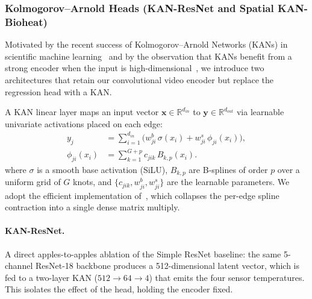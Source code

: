 \subsubsection{Kolmogorov--Arnold Heads (KAN-ResNet and Spatial KAN-Bioheat)}\label{sec:kan_models}
Motivated by the recent success of Kolmogorov--Arnold Networks (KANs) in scientific machine learning~\cite{liu2024kan,wang2024kinn,patra2024pikan} and by the observation that KANs benefit from a strong encoder when the input is high-dimensional~\cite{shen2025alpkan}, we introduce two architectures that retain our convolutional video encoder but replace the regression head with a KAN.

A KAN linear layer maps an input vector $\mathbf{x}\in\mathbb{R}^{d_{in}}$ to $\mathbf{y}\in\mathbb{R}^{d_{out}}$ via learnable univariate activations placed on each edge:
\begin{align}
    y_j &= \sum_{i=1}^{d_{in}} \bigl( w^{b}_{ji}\,\sigma(x_i) + w^{s}_{ji}\, \phi_{ji}(x_i) \bigr), \\
    \phi_{ji}(x_i) &= \sum_{k=1}^{G+p} c_{jik}\, B_{k,p}(x_i).
\end{align}
where $\sigma$ is a smooth base activation (SiLU), $B_{k,p}$ are B-splines of order $p$ over a uniform grid of $G$ knots, and $\{c_{jik}, w^{b}_{ji}, w^{s}_{ji}\}$ are the learnable parameters. We adopt the efficient implementation of~\cite{blealtan2024efficientkan}, which collapses the per-edge spline contraction into a single dense matrix multiply.

\paragraph{KAN-ResNet.} A direct apples-to-apples ablation of the Simple ResNet baseline: the same 5-channel ResNet-18 backbone produces a 512-dimensional latent vector, which is fed to a two-layer KAN ($512 \to 64 \to 4$) that emits the four sensor temperatures. This isolates the effect of the head, holding the encoder fixed.

